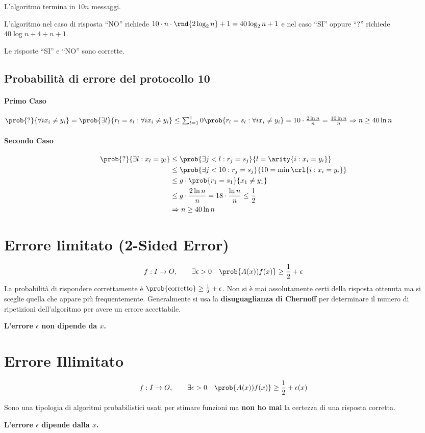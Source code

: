 \documentclass[\main/main.tex]{subfiles}
\begin{document}
L'algoritmo termina in \(10n\) messaggi.

L'algoritmo nel caso di risposta ``NO'' richiede \(10\cdot n \cdot \rnd{2 \log_2 n} + 1 = 40\log_2 n +1\) e nel caso ``SI'' oppure ``?'' richiede \(40 \log n + 4 + n +1\).

Le risposte ``SI'' e ``NO'' sono corrette.

\subsection{Probabilità di errore del protocollo 10}
\paragraph{Primo Caso} \(\prob{?}{\forall i x_i \neq y_i} = \prob{\exists l}{ r_l = s_l: \forall i x_i \neq y_i} \leq \sum_{l=1}^10 \prob{ r_l = s_l: \forall i x_i \neq y_i} = 10\cdot \frac{2\ln n}{n} = \frac{10\ln n}{n} \Rightarrow n \geq 40 \ln n\)
\paragraph{Secondo Caso}
\begin{align*}
	\prob{?}{\exists l: x_l = y_l} & \leq \prob{\exists j < l: r_j = s_j}{l= \arity{i: x_i = y_i}}           \\
	                               & \leq \prob{\exists j < 10: r_j = s_j}{10 = \min\crl{i: x_i = y_i}}      \\
	                               & \leq g\cdot \prob{r_1 = s_1}{x_1 \neq y_1}                              \\
	                               & \leq g\cdot \frac{2\ln n}{n} = 18\cdot \frac{\ln n}{n} \leq \frac{1}{2} \\
	                               & \Rightarrow n \geq 40 \ln n
\end{align*}

\section{Errore limitato (2-Sided Error)}
\[
	f: I \rightarrow O, \qquad \exists \epsilon > 0 \quad \prob{A(x) ) f(x)} \geq \frac{1}{2} + \epsilon
\]
La probabilità di rispondere correttamente è \(\prob{\text{corretto}} \geq \frac{1}{2} + \epsilon\). Non si è mai assolutamente certi della risposta ottenuta ma si sceglie quella che appare più frequentemente. Generalmente si usa la \textbf{disuguaglianza di Chernoff} per determinare il numero di ripetizioni dell'algoritmo per avere un errore accettabile.

\textbf{L'errore \(\epsilon \) non dipende da \(x\).}

\section{Errore Illimitato}
\[
	f: I \rightarrow O, \qquad \exists \epsilon > 0 \quad \prob{A(x) ) f(x)} \geq \frac{1}{2} + \epsilon(x)
\]

Sono una tipologia di algoritmi probabilistici usati per stimare funzioni ma \textbf{non ho mai} la certezza di una risposta corretta.

\textbf{L'errore \(\epsilon\) dipende dalla \(x\).}
\end{document}
